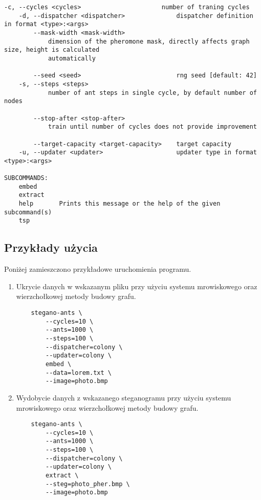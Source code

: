 {{{\begin{lstlisting}[basicstyle=\tiny, caption=Pomoc programu, label=code:help]
    -c, --cycles <cycles>                      number of traning cycles
    -d, --dispatcher <dispatcher>              dispatcher definition in format <type>:<args>
        --mask-width <mask-width>
            dimension of the pheromone mask, directly affects graph size, height is calculated
            automatically

        --seed <seed>                          rng seed [default: 42]
    -s, --steps <steps>
            number of ant steps in single cycle, by default number of nodes

        --stop-after <stop-after>
            train until number of cycles does not provide improvement

        --target-capacity <target-capacity>    target capacity
    -u, --updater <updater>                    updater type in format <type>:<args>

SUBCOMMANDS:
    embed
    extract
    help       Prints this message or the help of the given subcommand(s)
    tsp
            \end{lstlisting}
        }

        \subsection{Przykłady użycia}
        {
            Poniżej zamieszczono przykładowe uruchomienia programu.

            \begin{enumerate}
                \item Ukrycie danych w wskazanym pliku przy użyciu systemu mrowiskowego oraz wierzchołkowej metody
                budowy grafu.

                \begin{lstlisting}
    stegano-ants \
        --cycles=10 \
        --ants=1000 \
        --steps=100 \
        --dispatcher=colony \
        --updater=colony \
        embed \
        --data=lorem.txt \
        --image=photo.bmp
                \end{lstlisting}

                \item Wydobycie danych z wskazanego steganogramu przy użyciu systemu mrowiskowego oraz wierzchołkowej
                metody budowy grafu.

                \begin{lstlisting}
    stegano-ants \
        --cycles=10 \
        --ants=1000 \
        --steps=100 \
        --dispatcher=colony \
        --updater=colony \
        extract \
        --steg=photo_pher.bmp \
        --image=photo.bmp
                \end{lstlisting}


\end{enumerate}}}}
